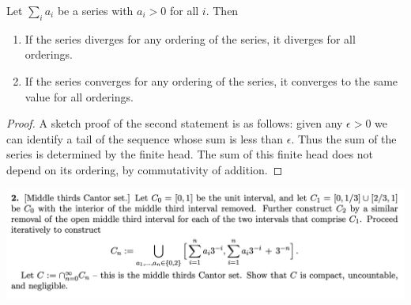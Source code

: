 \begin{itemize}
  \begin{lemma}
      Let $\sum_i a_i$ be a series with $a_i > 0$ for all $i$. Then
      \begin{enumerate}
      \item If the series diverges for any ordering of the series, it diverges for all orderings.
      \item If the series converges for any ordering of the series, it converges to the same value for all
        orderings.
      \end{enumerate}
  \end{lemma}
  \begin{proof}
    A sketch proof of the second statement is as follows: given any $\epsilon > 0$ we can identify a tail of
    the sequence whose sum is less than $\epsilon$. Thus the sum of the series is determined by the finite
    head. The sum of this finite head does not depend on its ordering, by commutativity of addition.
  \end{proof}
\end{itemize}



\begin{mdframed}
  \includegraphics[width=400pt]{img/analysis--berkeley-202a-8d78.png}
\end{mdframed}


